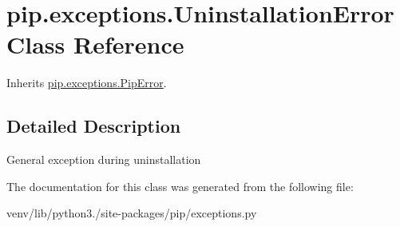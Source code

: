 \hypertarget{classpip_1_1exceptions_1_1_uninstallation_error}{}\section{pip.\+exceptions.\+Uninstallation\+Error Class Reference}
\label{classpip_1_1exceptions_1_1_uninstallation_error}


Inherits \hyperlink{classpip_1_1exceptions_1_1_pip_error}{pip.\+exceptions.\+Pip\+Error}.



\subsection{Detailed Description}
\begin{DoxyVerb}General exception during uninstallation\end{DoxyVerb}
 

The documentation for this class was generated from the following file\+:\begin{DoxyCompactItemize}
\item 
venv/lib/python3./site-\/packages/pip/exceptions.\+py\end{DoxyCompactItemize}
